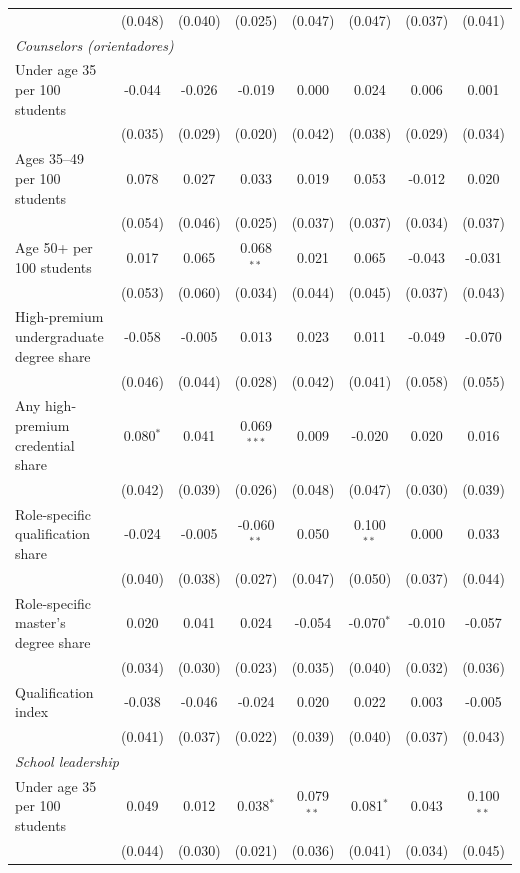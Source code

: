 \begin{table}[!htbp]
{\begin{tabular}{lccccccc}
 & (0.048) & (0.040) & (0.025) & (0.047) & (0.047) & (0.037) & (0.041) \\
\multicolumn{8}{l}{\textit{Counselors (orientadores)}} \\
\quad Under age 35 per 100 students & -0.044 & -0.026 & -0.019 & 0.000 & 0.024 & 0.006 & 0.001 \\
 & (0.035) & (0.029) & (0.020) & (0.042) & (0.038) & (0.029) & (0.034) \\
\quad Ages 35--49 per 100 students & 0.078 & 0.027 & 0.033 & 0.019 & 0.053 & -0.012 & 0.020 \\
 & (0.054) & (0.046) & (0.025) & (0.037) & (0.037) & (0.034) & (0.037) \\
\quad Age 50+ per 100 students & 0.017 & 0.065 & 0.068$^{**}$ & 0.021 & 0.065 & -0.043 & -0.031 \\
 & (0.053) & (0.060) & (0.034) & (0.044) & (0.045) & (0.037) & (0.043) \\
\quad High-premium undergraduate degree share & -0.058 & -0.005 & 0.013 & 0.023 & 0.011 & -0.049 & -0.070 \\
 & (0.046) & (0.044) & (0.028) & (0.042) & (0.041) & (0.058) & (0.055) \\
\quad Any high-premium credential share & 0.080$^{*}$ & 0.041 & 0.069$^{***}$ & 0.009 & -0.020 & 0.020 & 0.016 \\
 & (0.042) & (0.039) & (0.026) & (0.048) & (0.047) & (0.030) & (0.039) \\
\quad Role-specific qualification share & -0.024 & -0.005 & -0.060$^{**}$ & 0.050 & 0.100$^{**}$ & 0.000 & 0.033 \\
 & (0.040) & (0.038) & (0.027) & (0.047) & (0.050) & (0.037) & (0.044) \\
\quad Role-specific master's degree share & 0.020 & 0.041 & 0.024 & -0.054 & -0.070$^{*}$ & -0.010 & -0.057 \\
 & (0.034) & (0.030) & (0.023) & (0.035) & (0.040) & (0.032) & (0.036) \\
\quad Qualification index & -0.038 & -0.046 & -0.024 & 0.020 & 0.022 & 0.003 & -0.005 \\
 & (0.041) & (0.037) & (0.022) & (0.039) & (0.040) & (0.037) & (0.043) \\
\multicolumn{8}{l}{\textit{School leadership}} \\
\quad Under age 35 per 100 students & 0.049 & 0.012 & 0.038$^{*}$ & 0.079$^{**}$ & 0.081$^{*}$ & 0.043 & 0.100$^{**}$ \\
 & (0.044) & (0.030) & (0.021) & (0.036) & (0.041) & (0.034) & (0.045) \\

\end{tabular}}
\end{table}
